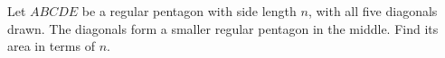 Let $ABCDE$ be a regular pentagon with side length $n$, with all five diagonals drawn. The diagonals form a smaller regular pentagon in the middle. Find its area in terms of $n$.
